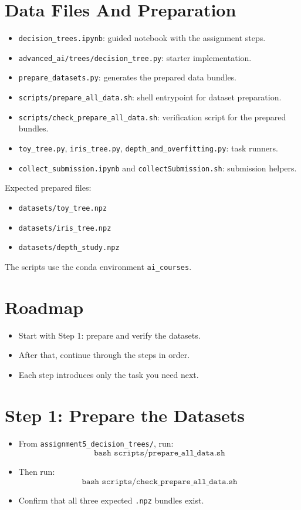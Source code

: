 \section*{Data Files And Preparation}
\begin{itemize}
  \item \texttt{decision\_trees.ipynb}: guided notebook with the assignment steps.
  \item \texttt{advanced\_ai/trees/decision\_tree.py}: starter implementation.
  \item \texttt{prepare\_datasets.py}: generates the prepared data bundles.
  \item \texttt{scripts/prepare\_all\_data.sh}: shell entrypoint for dataset preparation.
  \item \texttt{scripts/check\_prepare\_all\_data.sh}: verification script for the prepared bundles.
  \item \texttt{toy\_tree.py}, \texttt{iris\_tree.py}, \texttt{depth\_and\_overfitting.py}: task runners.
  \item \texttt{collect\_submission.ipynb} and \texttt{collectSubmission.sh}: submission helpers.
\end{itemize}

\medskip
Expected prepared files:
\begin{itemize}
  \item \texttt{datasets/toy\_tree.npz}
  \item \texttt{datasets/iris\_tree.npz}
  \item \texttt{datasets/depth\_study.npz}
\end{itemize}

\medskip
The scripts use the conda environment \texttt{ai\_courses}.

\section*{Roadmap}
\begin{itemize}
  \item Start with Step 1: prepare and verify the datasets.
  \item After that, continue through the steps in order.
  \item Each step introduces only the task you need next.
\end{itemize}

\section*{Step 1: Prepare the Datasets}
\begin{itemize}
  \item From \texttt{assignment5\_decision\_trees/}, run:
  \[
    \texttt{bash scripts/prepare\_all\_data.sh}
  \]
  \item Then run:
  \[
    \texttt{bash scripts/check\_prepare\_all\_data.sh}
  \]
  \item Confirm that all three expected \texttt{.npz} bundles exist.
\end{itemize}

